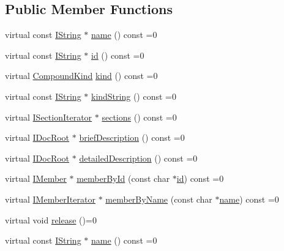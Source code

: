 \subsection*{Public Member Functions}
\begin{DoxyCompactItemize}
\item 
virtual const \mbox{\hyperlink{class_i_string}{I\+String}} $\ast$ \mbox{\hyperlink{class_i_compound_ae14b5dcf513ef0d263119aeb2e2ffb15}{name}} () const =0
\item 
virtual const \mbox{\hyperlink{class_i_string}{I\+String}} $\ast$ \mbox{\hyperlink{class_i_compound_ac5c371dee7e65324518532b0a58c2d9f}{id}} () const =0
\item 
virtual \mbox{\hyperlink{class_i_compound_a6b86be2ca9f6759434c1dd8405be328a}{Compound\+Kind}} \mbox{\hyperlink{class_i_compound_ad0d6fb22a48b5bbddae2b88a3cab3640}{kind}} () const =0
\item 
virtual const \mbox{\hyperlink{class_i_string}{I\+String}} $\ast$ \mbox{\hyperlink{class_i_compound_a49a7cb96ed8364494bdb7ecc1abb86c9}{kind\+String}} () const =0
\item 
virtual \mbox{\hyperlink{class_i_section_iterator}{I\+Section\+Iterator}} $\ast$ \mbox{\hyperlink{class_i_compound_a966a7cac6a4f33f16ef869e74855ab3b}{sections}} () const =0
\item 
virtual \mbox{\hyperlink{class_i_doc_root}{I\+Doc\+Root}} $\ast$ \mbox{\hyperlink{class_i_compound_a1ac3073130ef6bdd552c275e488c0658}{brief\+Description}} () const =0
\item 
virtual \mbox{\hyperlink{class_i_doc_root}{I\+Doc\+Root}} $\ast$ \mbox{\hyperlink{class_i_compound_a9630b083767887a40040cb4408d538cd}{detailed\+Description}} () const =0
\item 
virtual \mbox{\hyperlink{class_i_member}{I\+Member}} $\ast$ \mbox{\hyperlink{class_i_compound_af30652d3b5a43722e9407c8edf9a38fb}{member\+By\+Id}} (const char $\ast$\mbox{\hyperlink{class_i_compound_ac5c371dee7e65324518532b0a58c2d9f}{id}}) const =0
\item 
virtual \mbox{\hyperlink{class_i_member_iterator}{I\+Member\+Iterator}} $\ast$ \mbox{\hyperlink{class_i_compound_af94f0805a794ec5f413c9e16347e2591}{member\+By\+Name}} (const char $\ast$\mbox{\hyperlink{class_i_compound_ae14b5dcf513ef0d263119aeb2e2ffb15}{name}}) const =0
\item 
virtual void \mbox{\hyperlink{class_i_compound_a5388c74d390323ce610f752a01456b21}{release}} ()=0
\item 
virtual const \mbox{\hyperlink{class_i_string}{I\+String}} $\ast$ \mbox{\hyperlink{class_i_compound_ae14b5dcf513ef0d263119aeb2e2ffb15}{name}} () const =0

\end{DoxyCompactItemize}
